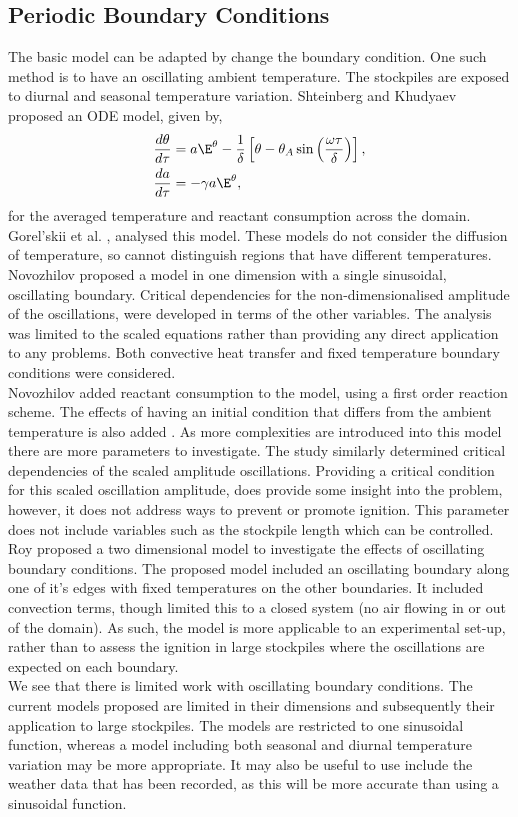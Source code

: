 \subsection{Periodic Boundary Conditions}
The basic model can be adapted by change the boundary condition. One such method is to have an oscillating ambient temperature. The stockpiles are exposed to diurnal and seasonal temperature variation. Shteinberg and Khudyaev \cite{shtein05} proposed an ODE model, given by,
\begin{align}
\frac{d\theta}{d\tau}&=a\E^\theta-\frac{1}{\delta}\left[\theta-\theta_A\sin\left(\frac{\omega\tau}{\delta}\right)\right],\\
\frac{da}{d\tau}&=-\gamma a\E^\theta,
\end{align}
for the averaged temperature and reactant consumption across the domain. Gorel'skii et al. \cite{gorel10}, analysed this model. These models do not consider the diffusion of temperature, so cannot distinguish regions that have different temperatures. \\
Novozhilov \cite{novozhilov16} proposed a model in one dimension with a single sinusoidal, oscillating boundary. Critical dependencies for the non-dimensionalised amplitude of the oscillations, were developed in terms of the other variables. The analysis was limited to the scaled equations rather than providing any direct application to any problems. Both convective heat transfer and fixed temperature boundary conditions were considered.\\
Novozhilov \cite{novozhilov18} added reactant consumption to the model, using a first order reaction scheme. The effects of having an initial condition that differs from the ambient temperature is also added \cite{novozhilov18}. As more complexities are introduced into this model there are more parameters to investigate. The study similarly determined critical dependencies of the scaled amplitude oscillations. Providing a critical condition for this scaled oscillation amplitude, does provide some insight into the problem, however, it does not address ways to prevent or promote ignition. This parameter does not include variables such as the stockpile length which can be controlled.\\ 
Roy \cite{roy18} proposed a two dimensional model to investigate the effects of oscillating boundary conditions. The proposed model included an oscillating boundary along one of it's edges with fixed temperatures on the other boundaries. It included convection terms, though limited this to a closed system (no air flowing in or out of the domain). As such, the model is more applicable to an experimental set-up, rather than to assess the ignition in large stockpiles where the oscillations are expected on each boundary.\\ 
We see that there is limited work with oscillating boundary conditions. The current models proposed are limited in their dimensions and subsequently their application to large stockpiles. The models are restricted to one sinusoidal function, whereas a model including both seasonal and diurnal temperature variation may be more appropriate. It may also be useful to use include the weather data that has been recorded, as this will be more accurate than using a sinusoidal function.

